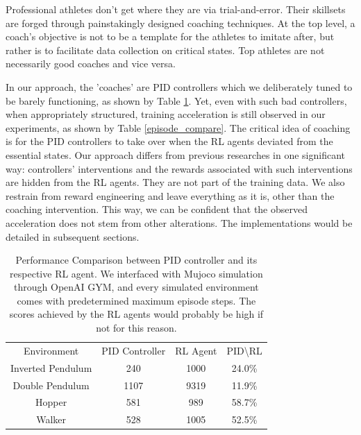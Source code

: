 \documentclass[journal]{IEEEtran}
\begin{document}
Professional athletes don't get where they are via trial-and-error. Their skillsets are forged through painstakingly designed coaching techniques. At the top level, a coach's objective is not to be a template for the athletes to imitate after, but rather is to facilitate data collection on critical states. Top athletes are not necessarily good coaches and vice versa. 

In our approach, the 'coaches' are PID controllers which we deliberately tuned to be barely functioning, as shown by Table \ref{score_compare}. Yet, even with such bad controllers, when appropriately structured, training acceleration is still observed in our experiments, as shown by Table \ref{episode_compare}. The critical idea of coaching is for the PID controllers to take over when the RL agents deviated from the essential states. Our approach differs from previous researches in one significant way: controllers' interventions and the rewards associated with such interventions are hidden from the RL agents. They are not part of the training data. We also restrain from reward engineering and leave everything as it is, other than the coaching intervention. This way, we can be confident that the observed acceleration does not stem from other alterations. The implementations would be detailed in subsequent sections.


\begin{table}
\footnotesize
\caption{Performance Comparison between PID controller and its respective RL agent. We interfaced with Mujoco simulation through OpenAI GYM, and every simulated environment comes with predetermined maximum episode steps. The scores achieved by the RL agents would probably be high if not for this reason.}
\label{score_compare}
\centering
\begin{tabular}{ cccc }
\rowcolor{airforceblue}
Environment &   PID Controller &RL Agent &PID\textbackslash RL \\
Inverted Pendulum &  240 & 1000&  24.0\%\\
\rowcolor{beaublue}

Double Pendulum &  1107 & 9319& 11.9\%\\

Hopper &  581 & 989& 58.7\%\\
\rowcolor{beaublue}
Walker &  528 & 1005& 52.5\%\\
\end{tabular}
\end{table}
\end{document}
